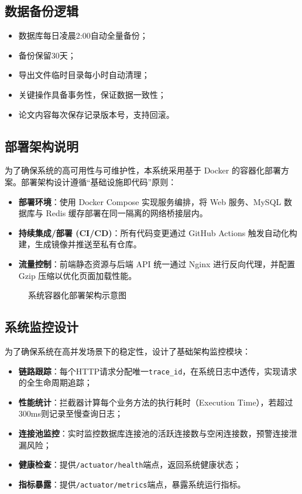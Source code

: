 \documentclass{../template/softeng}
\begin{document}
	\subsection{数据备份逻辑}
	\begin{itemize}
		\item 数据库每日凌晨2:00自动全量备份；
		\item 备份保留30天；
		\item 导出文件临时目录每小时自动清理；
		\item 关键操作具备事务性，保证数据一致性；
		\item 论文内容每次保存记录版本号，支持回滚。
	\end{itemize}
    \subsection{部署架构说明}
为了确保系统的高可用性与可维护性，本系统采用基于 Docker 的容器化部署方案。部署架构设计遵循“基础设施即代码”原则：

\begin{itemize}
    \item \textbf{部署环境}：使用 Docker Compose 实现服务编排，将 Web 服务、MySQL 数据库与 Redis 缓存部署在同一隔离的网络桥接层内。
    \item \textbf{持续集成/部署 (CI/CD)}：所有代码变更通过 GitHub Actions 触发自动化构建，生成镜像并推送至私有仓库。
    \item \textbf{流量控制}：前端静态资源与后端 API 统一通过 Nginx 进行反向代理，并配置 Gzip 压缩以优化页面加载性能。
\end{itemize}

\begin{figure}[htbp]
    \centering
    \caption{系统容器化部署架构示意图}
    \label{fig:deployment}
\end{figure}

	\subsection{系统监控设计}
	为了确保系统在高并发场景下的稳定性，设计了基础架构监控模块：
	\begin{itemize}
		\item \textbf{链路跟踪}：每个HTTP请求分配唯一\texttt{trace\_id}，在系统日志中透传，实现请求的全生命周期追踪；
		\item \textbf{性能统计}：拦截器计算每个业务方法的执行耗时（Execution Time），若超过300ms则记录至慢查询日志；
		\item \textbf{连接池监控}：实时监控数据库连接池的活跃连接数与空闲连接数，预警连接泄漏风险；
		\item \textbf{健康检查}：提供\texttt{/actuator/health}端点，返回系统健康状态；
		\item \textbf{指标暴露}：提供\texttt{/actuator/metrics}端点，暴露系统运行指标。
	\end{itemize}
\end{document}
